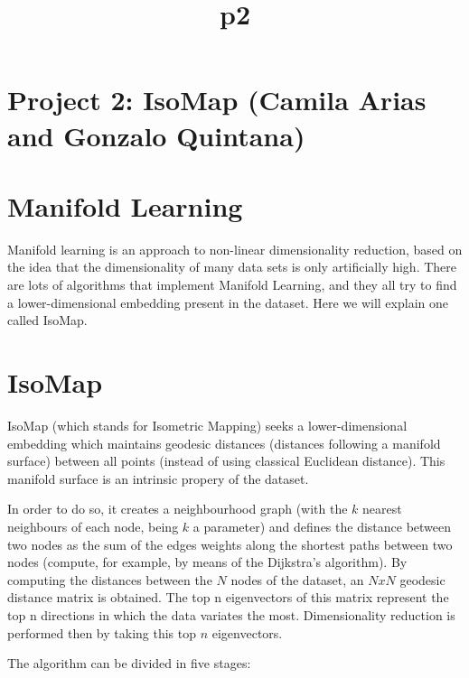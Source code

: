 \documentclass[11pt]{article}
\title{p2}
\begin{document}
    
    
    \maketitle
    
    

    
    \section{Project 2: IsoMap (Camila Arias and Gonzalo
Quintana)}\label{project-2-isomap-camila-arias-and-gonzalo-quintana}

    \section{Manifold Learning}\label{manifold-learning}

    Manifold learning is an approach to non-linear dimensionality reduction,
based on the idea that the dimensionality of many data sets is only
artificially high. There are lots of algorithms that implement Manifold
Learning, and they all try to find a lower-dimensional embedding present
in the dataset. Here we will explain one called IsoMap.

    \section{IsoMap}\label{isomap}

    IsoMap (which stands for Isometric Mapping) seeks a lower-dimensional
embedding which maintains geodesic distances (distances following a
manifold surface) between all points (instead of using classical
Euclidean distance). This manifold surface is an intrinsic propery of
the dataset.

In order to do so, it creates a neighbourhood graph (with the \(k\)
nearest neighbours of each node, being \(k\) a parameter) and defines
the distance between two nodes as the sum of the edges weights along the
shortest paths between two nodes (compute, for example, by means of the
Dijkstra's algorithm). By computing the distances between the \(N\)
nodes of the dataset, an \(NxN\) geodesic distance matrix is obtained.
The top n eigenvectors of this matrix represent the top n directions in
which the data variates the most. Dimensionality reduction is performed
then by taking this top \(n\) eigenvectors.

The algorithm can be divided in five stages:
\end{document}
